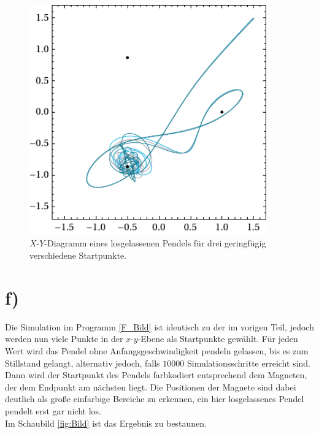 \begin{figure}[t]
	\centering
	\includegraphics[width=290pt]{img/xy.pdf}
	\caption{$X$-$Y$-Diagramm eines losgelassenen Pendels für drei geringfügig verschiedene Startpunkte.}
	\label{fig:xy}
\end{figure}


\section*{f)}
Die Simulation im Programm \ref{F_Bild} ist identisch zu der im vorigen Teil, jedoch werden nun viele Punkte in der $x$-$y$-Ebene als Startpunkte gewählt. Für jeden Wert wird das Pendel ohne Anfangsgeschwindigkeit pendeln gelassen, bis es zum Stillstand gelangt, alternativ jedoch, falls $10000$ Simulationsschritte erreicht sind. Dann wird der Startpunkt des Pendels farbkodiert entsprechend dem Magneten, der dem Endpunkt am nächsten liegt. Die Positionen der Magnete sind dabei deutlich als große einfarbige Bereiche zu erkennen, ein hier losgelassenes Pendel pendelt erst gar nicht los.\\
Im Schaubild \ref{fig:Bild} ist das Ergebnis zu bestaunen.



